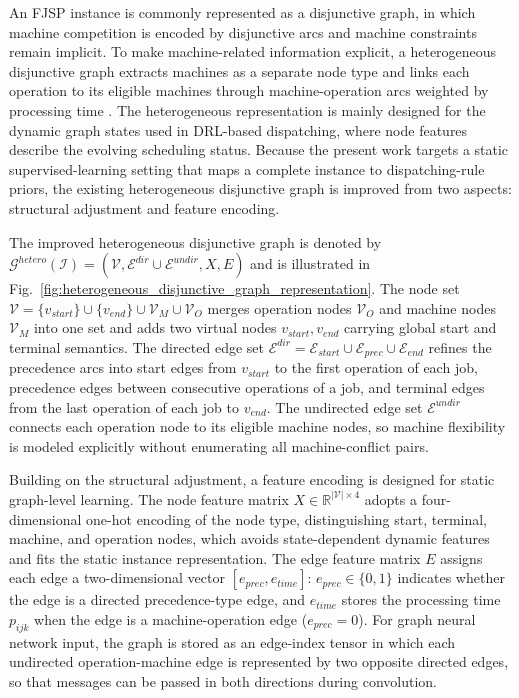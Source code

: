 \documentclass[pdflatex,iicol,Numbered,sn-basic]{sn-jnl}
\begin{document}
An FJSP instance is commonly represented as a disjunctive graph, in which machine competition is encoded by disjunctive arcs and machine constraints remain implicit.
To make machine-related information explicit, a heterogeneous disjunctive graph extracts machines as a separate node type and links each operation to its eligible machines through machine-operation arcs weighted by processing time \cite{song2022flexible}.
The heterogeneous representation is mainly designed for the dynamic graph states used in DRL-based dispatching, where node features describe the evolving scheduling status.
Because the present work targets a static supervised-learning setting that maps a complete instance to dispatching-rule priors, the existing heterogeneous disjunctive graph is improved from two aspects: structural adjustment and feature encoding.

The improved heterogeneous disjunctive graph is denoted by $\mathcal{G}^{hetero}(\mathcal{I})=(\mathcal{V},\mathcal{E}^{dir}\cup\mathcal{E}^{undir},X,E)$ and is illustrated in Fig.~\ref{fig:heterogeneous_disjunctive_graph_representation}.
The node set $\mathcal{V}=\{v_{start}\}\cup\{v_{end}\}\cup\mathcal{V}_M\cup\mathcal{V}_O$ merges operation nodes $\mathcal{V}_O$ and machine nodes $\mathcal{V}_M$ into one set and adds two virtual nodes $v_{start},v_{end}$ carrying global start and terminal semantics.
The directed edge set $\mathcal{E}^{dir}=\mathcal{E}_{start}\cup\mathcal{E}_{prec}\cup\mathcal{E}_{end}$ refines the precedence arcs into start edges from $v_{start}$ to the first operation of each job, precedence edges between consecutive operations of a job, and terminal edges from the last operation of each job to $v_{end}$.
The undirected edge set $\mathcal{E}^{undir}$ connects each operation node to its eligible machine nodes, so machine flexibility is modeled explicitly without enumerating all machine-conflict pairs.

Building on the structural adjustment, a feature encoding is designed for static graph-level learning.
The node feature matrix $X\in\mathbb{R}^{|\mathcal{V}|\times4}$ adopts a four-dimensional one-hot encoding of the node type, distinguishing start, terminal, machine, and operation nodes, which avoids state-dependent dynamic features and fits the static instance representation.
The edge feature matrix $E$ assigns each edge a two-dimensional vector $[e_{prec},e_{time}]$: $e_{prec}\in\{0,1\}$ indicates whether the edge is a directed precedence-type edge, and $e_{time}$ stores the processing time $p_{ijk}$ when the edge is a machine-operation edge ($e_{prec}=0$).
For graph neural network input, the graph is stored as an edge-index tensor in which each undirected operation-machine edge is represented by two opposite directed edges, so that messages can be passed in both directions during convolution.
\end{document}
